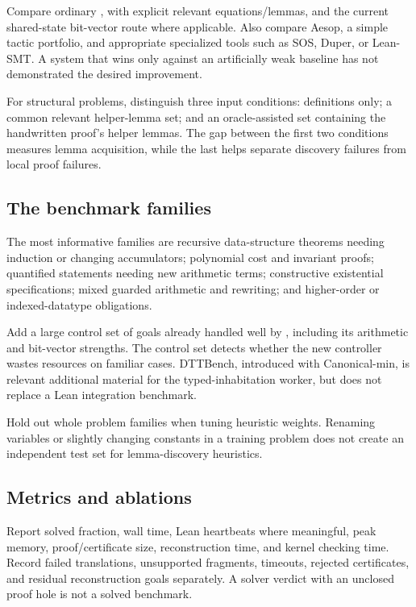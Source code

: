 Compare ordinary \Grind{}, \Grind{} with explicit relevant equations/lemmas,
and the current shared-state bit-vector route where applicable. Also compare
Aesop, a simple tactic portfolio, and appropriate specialized tools such as
SOS, Duper, or Lean-SMT. A system that wins only against an artificially weak
baseline has not demonstrated the desired improvement.

For structural problems, distinguish three input conditions: definitions only;
a common relevant helper-lemma set; and an oracle-assisted set containing the
handwritten proof's helper lemmas. The gap between the first two conditions
measures lemma acquisition, while the last helps separate discovery failures
from local proof failures.

\subsection{The benchmark families}

The most informative families are recursive data-structure theorems needing
induction or changing accumulators; polynomial cost and invariant proofs;
quantified statements needing new arithmetic terms; constructive existential
specifications; mixed guarded arithmetic and rewriting; and higher-order or
indexed-datatype obligations.

Add a large control set of goals already handled well by \Grind{}, including
its arithmetic and bit-vector strengths. The control set detects whether the
new controller wastes resources on familiar cases. DTTBench, introduced with
Canonical-min, is relevant additional material for the typed-inhabitation
worker, but does not replace a Lean integration benchmark.\cite{canonicalmin}

Hold out whole problem families when tuning heuristic weights. Renaming
variables or slightly changing constants in a training problem does not
create an independent test set for lemma-discovery heuristics.

\subsection{Metrics and ablations}

Report solved fraction, wall time, Lean heartbeats where meaningful, peak
memory, proof/certificate size, reconstruction time, and kernel checking time.
Record failed translations, unsupported fragments, timeouts, rejected
certificates, and residual reconstruction goals separately. A solver verdict
with an unclosed proof hole is not a solved benchmark.

